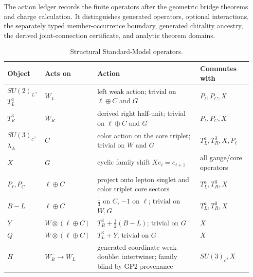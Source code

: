 \documentclass[12pt,a4paper]{article}
\begin{document}
The action ledger records the finite operators after the geometric bridge
theorems and charge calculation.  It distinguishes generated operators,
optional interactions, the separately typed member-occurrence boundary,
generated chirality ancestry, the derived joint-connection certificate, and analytic
theorem domains.
\begin{table}[H]
\centering
\caption[Structural Standard-Model operators]{Structural Standard-Model operators.}
\label{p5:tab:action-summary}
\renewcommand{\arraystretch}{1.2}
\begin{tabularx}{\textwidth}{>{\raggedright\arraybackslash}p{}
                                >{\raggedright\arraybackslash}p{}
                                >{\raggedright\arraybackslash}X
                                >{\raggedright\arraybackslash}p{}}
\toprule
\textbf{Object} & \textbf{Acts on} & \textbf{Action} & \textbf{Commutes with} \\
\midrule
\(SU(2)_L\), \(T_L^a\) &
\(W_L\) &
left weak action; trivial on \(\ell\oplus C\) and \(G\) &
\(P_\ell,P_C,X\) \\

\(T_R^3\) &
\(W_R\) &
derived right half-unit; trivial on \(\ell\oplus C\) and \(G\) &
\(P_\ell,P_C,X\) \\

\(SU(3)_c\), \(\lambda_A\) &
\(C\) &
color action on the core triplet; trivial on \(W\) and \(G\) &
\(T_L^a,T_R^3,X,P_\ell\) \\

\(X\) &
\(G\) &
cyclic family shift \(Xe_i=e_{i+1}\) &
all gauge/core operators \\

\(P_\ell,P_C\) &
\(\ell\oplus C\) &
project onto lepton singlet and color triplet core sectors &
\(T_L^a,T_R^3,X\) \\

\(B-L\) &
\(\ell\oplus C\) &
\(\frac13\) on \(C\), \(-1\) on \(\ell\); trivial on \(W,G\) &
\(T_L^a,T_R^3,X\) \\

\(Y\) &
\(W\otimes(\ell\oplus C)\) &
\(T_R^3+\frac12(B-L)\); trivial on \(G\) &
\(X\) \\

\(Q\) &
\(W\otimes(\ell\oplus C)\) &
\(T_L^3+Y\); trivial on \(G\) &
\(X\) \\

\(H\) &
\(W_R^{-}\to W_L\) &
generated coordinate weak-doublet intertwiner; family blind by GP2
provenance &
\(SU(3)_c,X\) \\


\end{tabularx}
\end{table}
\end{document}
